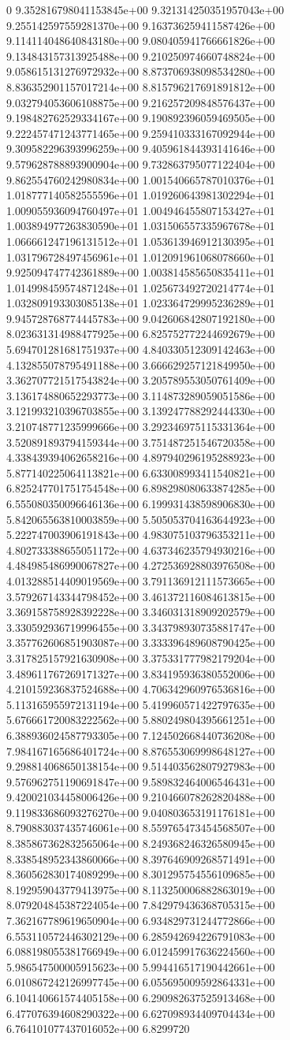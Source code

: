 0	9.352816798041153845e+00	9.321314250351957043e+00	9.255142597559281370e+00	9.163736259411587426e+00	9.114114048640843180e+00	9.080405941766661826e+00	9.134843157313925488e+00	9.210250974660748824e+00	9.058615131276972932e+00	8.873706938098534280e+00	8.836352901157017214e+00	8.815796217691891812e+00	9.032794053606108875e+00	9.216257209848576437e+00	9.198482762529334167e+00	9.190892396059469505e+00	9.222457471243771465e+00	9.259410333167092944e+00	9.309582296393996259e+00	9.405961844393141646e+00	9.579628788893900904e+00	9.732863795077122404e+00	9.862554760242980834e+00	1.001540665787010376e+01	1.018777140582555596e+01	1.019260643981302294e+01	1.009055936094760497e+01	1.004946455807153427e+01	1.003894977263830590e+01	1.031506557335967678e+01	1.066661247196131512e+01	1.053613946912130395e+01	1.031796728497456961e+01	1.012091961068078660e+01	9.925094747742361889e+00	1.003814585650835411e+01	1.014998459574871248e+01	1.025673492720214774e+01	1.032809193303085138e+01	1.023364729995236289e+01	9.945728768774445783e+00	9.042606842807192180e+00	8.023631314988477925e+00	6.825752772244692679e+00	5.694701281681751937e+00	4.840330512309142463e+00	4.132855078795491188e+00	3.666629257121849950e+00	3.362707721517543824e+00	3.205789553050761409e+00	3.136174880652293773e+00	3.114873289059051586e+00	3.121993210396703855e+00	3.139247788292444330e+00	3.210748771235999666e+00	3.292346975115331364e+00	3.520891893794159344e+00	3.751487251546720358e+00	4.338439394062658216e+00	4.897940296195288923e+00	5.877140225064113821e+00	6.633008993411540821e+00	6.825247701751754548e+00	6.898298080633874285e+00	6.555080350096646136e+00	6.199931438598906830e+00	5.842065563810003859e+00	5.505053704163644923e+00	5.222747003906191843e+00	4.983075103796353211e+00	4.802733388655051172e+00	4.637346235794930216e+00	4.484985486990067827e+00	4.272536928803976508e+00	4.013288514409019569e+00	3.791136912111573665e+00	3.579267143344798452e+00	3.461372116084613815e+00	3.369158758928392228e+00	3.346031318909202579e+00	3.330592936719996455e+00	3.343798930735881747e+00	3.357762606851903087e+00	3.333396489608790425e+00	3.317825157921630908e+00	3.375331777982179204e+00	3.489611767269171327e+00	3.834195936380552006e+00	4.210159236837524688e+00	4.706342960976536816e+00	5.113165955972131194e+00	5.419960571422797635e+00	5.676661720083222562e+00	5.880249804395661251e+00	6.388936024587793305e+00	7.124502668440736208e+00	7.984167165686401724e+00	8.876553069998648127e+00	9.298814068650138154e+00	9.514403562807927983e+00	9.576962751190691847e+00	9.589832464006546431e+00	9.420021034458006426e+00	9.210466078262820488e+00	9.119833686093276270e+00	9.040803653191176181e+00	8.790883037435746061e+00	8.559765473454568507e+00	8.385867362832565064e+00	8.249368246326580945e+00	8.338548952343860066e+00	8.397646909268571491e+00	8.360562830174089299e+00	8.301295754556109685e+00	8.192959043779413975e+00	8.113250006882863019e+00	8.079204845387224054e+00	7.842979436368705315e+00	7.362167789619650904e+00	6.934829731244772866e+00	6.553110572446302129e+00	6.285942694226791083e+00	6.088198055381766949e+00	6.012459917636224560e+00	5.986547500005915623e+00	5.994416517190442661e+00	6.010867242126997745e+00	6.055695009592864331e+00	6.104140661574405158e+00	6.290982637525913468e+00	6.477076394608290322e+00	6.627098934409704434e+00	6.764101077437016052e+00	6.8299720